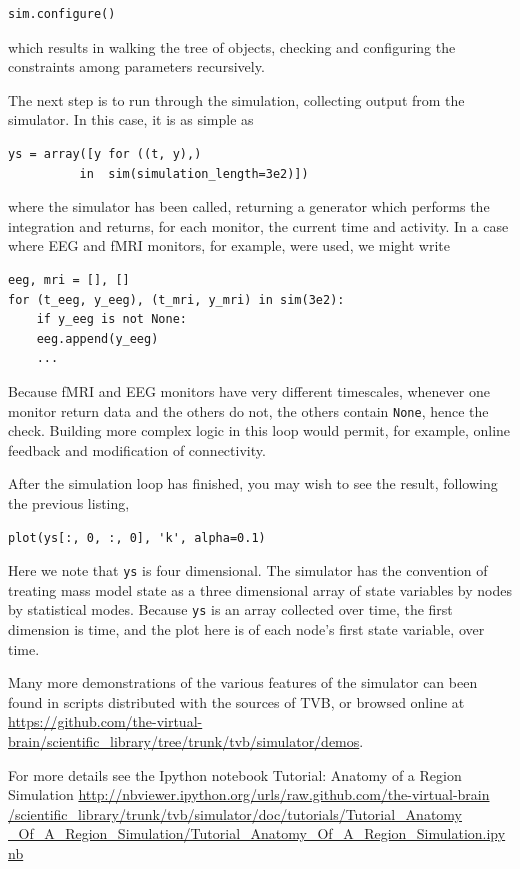 \begin{lstlisting}
sim.configure()
\end{lstlisting}

which results in walking the tree of objects, checking and 
configuring the constraints among parameters recursively.

The next step is to run through the simulation, collecting
output from the simulator. In this case, it is as simple as
\begin{lstlisting}
ys = array([y for ((t, y),) 
          in  sim(simulation_length=3e2)])
\end{lstlisting}
\noindent where the simulator has been called, returning a 
generator which performs the integration and returns, for each
monitor, the current time and activity. In a case where EEG 
and fMRI monitors, for example, were used, we might write
\begin{lstlisting}
eeg, mri = [], []
for (t_eeg, y_eeg), (t_mri, y_mri) in sim(3e2):
    if y_eeg is not None:
    eeg.append(y_eeg)
    ...
\end{lstlisting}
\noindent Because fMRI and EEG monitors have very different
timescales, whenever one monitor return data and the others do
not, the others contain \texttt{None}, hence the check. Building
more complex logic in this loop would permit, for example, online
feedback and modification of connectivity. 

After the simulation loop has finished, you may wish to see the
result, following the previous listing, 
\begin{lstlisting}
plot(ys[:, 0, :, 0], 'k', alpha=0.1)
\end{lstlisting}
\noindent Here we note that \texttt{ys} is four dimensional. The 
simulator has the convention of treating  mass model state as a
three dimensional array of state variables by nodes by statistical
modes. Because \texttt{ys} is an array collected over time, the first
dimension is time, and the plot here is of each node's first state
variable, over time.

Many more demonstrations of the various features of the simulator
can been found in scripts distributed with the sources of TVB, or 
browsed online at \url{https://github.com/the-virtual-brain/scientific_library/tree/trunk/tvb/simulator/demos}.

For more details see the Ipython notebook Tutorial: Anatomy of a Region Simulation 
\url{http://nbviewer.ipython.org/urls/raw.github.com/the-virtual-brain
/scientific_library/trunk/tvb/simulator/doc/tutorials/Tutorial_Anatomy
_Of_A_Region_Simulation/Tutorial_Anatomy_Of_A_Region_Simulation.ipynb}

